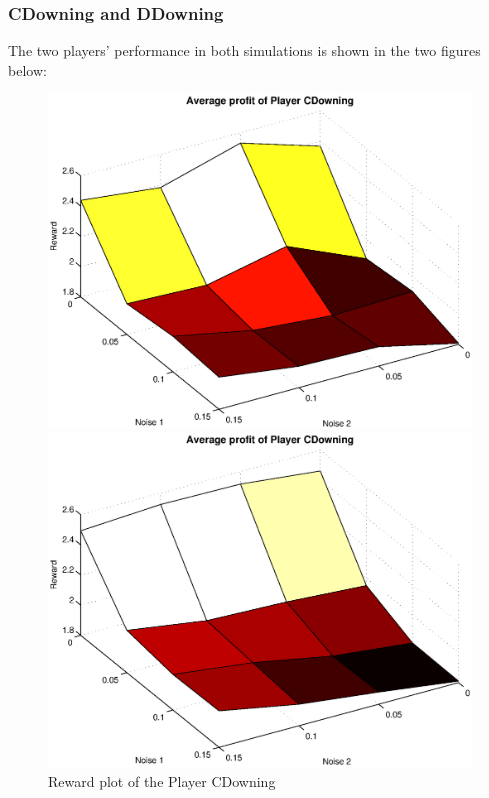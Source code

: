 \documentclass[11pt,twoside]{article}
\begin{document}
\subsubsection{CDowning and DDowning}
The two players' performance in both simulations is shown in the two figures below:
\begin{figure}[h]
\begin{minipage}[hbt]{0.65\textwidth}
	\centering
	\includegraphics[width=\textwidth]{pics/simulation1/Reward_vs_Noise_of_Player_CDowning}
\end{minipage}
\hfill
\begin{minipage}[hbt]{0.3\textwidth}
	\centering
	\includegraphics[width=\textwidth]{pics/simulation2/Reward_vs_Noise_of_Player_CDowning}
\end{minipage}
	\caption{Reward plot of the Player CDowning}
	\label{pic player cd}
\end{figure}
\end{document}
